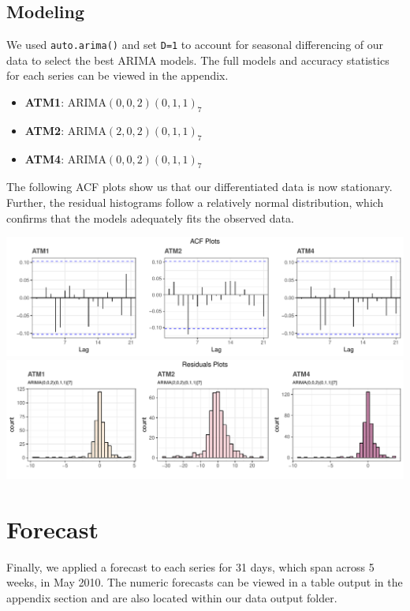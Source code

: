 \documentclass[openany]{book}
\providecommand{\tightlist}{%
  \setlength{\itemsep}{0pt}\setlength{\parskip}{0pt}}
\begin{document}
\hypertarget{modeling}{%
\subsection{Modeling}\label{modeling}}

We used \texttt{auto.arima()} and set \texttt{D=1} to account for
seasonal differencing of our data to select the best ARIMA models. The
full models and accuracy statistics for each series can be viewed in the
appendix.

\begin{itemize}
\tightlist
\item
  \textbf{ATM1}: ARIMA\((0,0,2)(0,1,1)_7\)
\item
  \textbf{ATM2}: ARIMA\((2,0,2)(0,1,1)_7\)
\item
  \textbf{ATM4}: ARIMA\((0,0,2)(0,1,1)_7\)
\end{itemize}

The following ACF plots show us that our differentiated data is now
stationary. Further, the residual histograms follow a relatively normal
distribution, which confirms that the models adequately fits the
observed data.

\includegraphics{Part-A-JM_files/figure-latex/unnamed-chunk-6-1.pdf}
\includegraphics{Part-A-JM_files/figure-latex/unnamed-chunk-6-2.pdf}

\hypertarget{forecast}{%
\section{Forecast}\label{forecast}}

Finally, we applied a forecast to each series for 31 days, which span
across 5 weeks, in May 2010. The numeric forecasts can be viewed in a
table output in the appendix section and are also located within our
data output folder.
\end{document}
